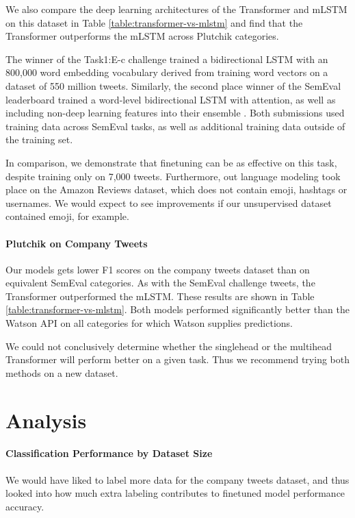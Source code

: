 \documentclass[letterpaper]{article} %
\begin{document}
We also compare the deep learning architectures of the Transformer and mLSTM on this dataset in Table \ref{table:transformer-vs-mlstm} and find that the Transformer outperforms the mLSTM across Plutchik categories.

The winner of the Task1:E-c challenge \cite{WinnerSemEval2018Task1} trained a bidirectional LSTM with an 800,000 word embedding vocabulary derived from training word vectors \cite{Mikolov2013} on a dataset of 550 million tweets. Similarly, the second place winner of the SemEval leaderboard trained a word-level bidirectional LSTM with attention, as well as including non-deep learning features into their ensemble \cite{ThirdPlaceSemEval2018Task1}. Both submissions used training data across SemEval tasks, as well as additional training data outside of the training set.

In comparison, we demonstrate that finetuning can be as effective on this task, despite training only on 7,000 tweets. Furthermore, out language modeling took place on the Amazon Reviews dataset, which does not contain emoji, hashtags or usernames. We would expect to see improvements if our unsupervised dataset contained emoji, for example.


\paragraph{Plutchik on Company Tweets}
Our models gets lower F1 scores on  the company tweets dataset than on equivalent SemEval categories.
As with the SemEval challenge tweets, the Transformer outperformed the mLSTM. These results are shown in Table \ref{table:transformer-vs-mlstm}. Both models performed significantly better than the Watson API on all categories for which Watson supplies predictions.

We could not conclusively determine whether the singlehead or the multihead Transformer will perform better on a given task. Thus we recommend trying both methods on a new dataset.


\section{Analysis}

\paragraph{Classification Performance by Dataset Size}
We would have liked to label more data for the company tweets dataset, and thus looked into how much extra labeling contributes to finetuned model performance accuracy.
\end{document}
